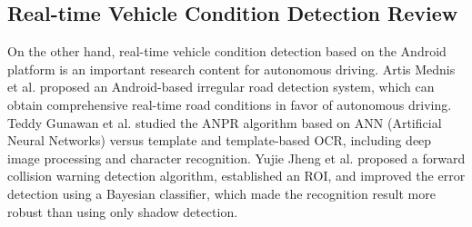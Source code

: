 \documentclass[12pt, a4paper]{article}
\begin{document}
\subsection{Real-time Vehicle Condition Detection Review}
On the other hand, real-time vehicle condition detection based on the Android platform \cite{google} is an important research content for autonomous driving. Artis Mednis et al. \cite{med} proposed an Android-based irregular road detection system, which can obtain comprehensive real-time road conditions in favor of autonomous driving.
Teddy Gunawan et al. \cite{ts} studied the ANPR algorithm based on ANN (Artificial Neural Networks) versus template and template-based OCR, including deep image processing and character recognition. Yujie Jheng et al. \cite{yj} proposed a forward collision warning detection algorithm, established an ROI, and improved the error detection using a Bayesian classifier, which made the recognition result more robust than using only shadow detection. 
\end{document}
